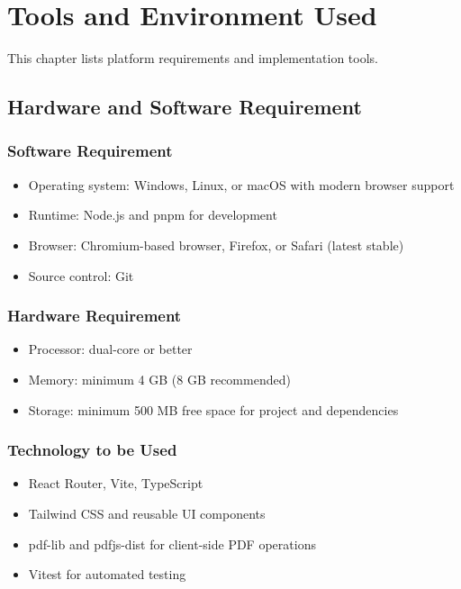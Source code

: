 \section{Tools and Environment Used}
This chapter lists platform requirements and implementation tools.

\subsection{Hardware and Software Requirement}
\subsubsection{Software Requirement}
\begin{itemize}
  \item Operating system: Windows, Linux, or macOS with modern browser support
  \item Runtime: Node.js and pnpm for development
  \item Browser: Chromium-based browser, Firefox, or Safari (latest stable)
  \item Source control: Git
\end{itemize}

\subsubsection{Hardware Requirement}
\begin{itemize}
  \item Processor: dual-core or better
  \item Memory: minimum 4 GB (8 GB recommended)
  \item Storage: minimum 500 MB free space for project and dependencies
\end{itemize}

\subsubsection{Technology to be Used}
\begin{itemize}
  \item React Router, Vite, TypeScript
  \item Tailwind CSS and reusable UI components
  \item pdf-lib and pdfjs-dist for client-side PDF operations
  \item Vitest for automated testing
\end{itemize}

